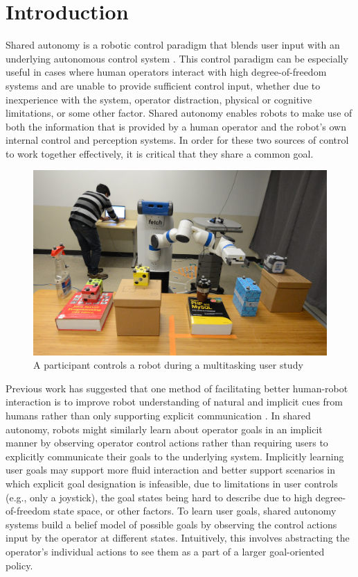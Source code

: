 \documentclass[conference]{IEEEtran}
\begin{document}
\section{Introduction}

Shared autonomy is a robotic control paradigm that blends user input with an underlying autonomous control system \cite{dragan2012formalizing, dragan2013policy, gopinath2017human}. This control paradigm can be especially useful in cases where human operators interact with high degree-of-freedom systems and are unable to provide sufficient control input, whether due to inexperience with the system, operator distraction, physical or cognitive limitations, or some other factor. Shared autonomy enables robots to make use of both the information that is provided by a human operator and the robot's own internal control and perception systems. In order for these two sources of control to work together effectively, it is critical that they share a common goal.

\begin{figure}
\includegraphics[width=\columnwidth]{figures/teaser-v2.jpg}
\caption{A participant controls a robot during a multitasking user study}
\label{teaser}
\end{figure}

Previous work has suggested that one method of facilitating better human-robot interaction is to improve robot understanding of natural and implicit cues from humans rather than only supporting explicit communication \cite{goodrich2003seven}. In shared autonomy, robots might similarly learn about operator goals in an implicit manner by observing operator control actions rather than requiring users to explicitly communicate their goals to the underlying system. Implicitly learning user goals may support more fluid interaction and better support scenarios in which explicit goal designation is infeasible, due to limitations in user controls (e.g., only a joystick), the goal states being hard to describe due to high degree-of-freedom state space, or other factors. To learn user goals, shared autonomy systems build a belief model of possible goals by observing the control actions input by the operator at different states. Intuitively, this involves abstracting the operator's individual actions to see them as a part of a larger goal-oriented policy.
\end{document}
